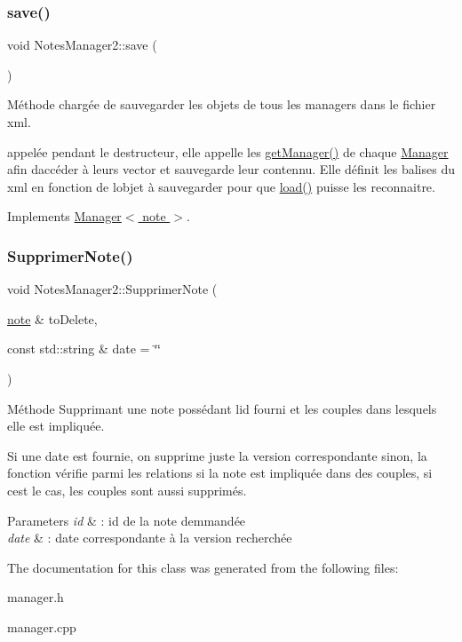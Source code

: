 \subsubsection{\texorpdfstring{save()}{save()}}
{\footnotesize\ttfamily void Notes\+Manager2\+::save (\begin{DoxyParamCaption}{ }\end{DoxyParamCaption})\hspace{0.3cm}{\ttfamily [virtual]}}



Méthode chargée de sauvegarder les objets de tous les managers dans le fichier xml. 

appelée pendant le destructeur, elle appelle les \hyperlink{class_notes_manager2_a392bc750d869bacbe50337531213f248}{get\+Manager()} de chaque \hyperlink{class_manager}{Manager} afin d\textquotesingle{}accéder à leurs vector et sauvegarde leur contennu. Elle définit les balises du xml en fonction de l\textquotesingle{}objet à sauvegarder pour que \hyperlink{class_notes_manager2_a2248b5b1620b2039fdba9b3c6476c6cc}{load()} puisse les reconnaitre. 

Implements \hyperlink{class_manager_a952734cfd645e6b257ef19ab06d4ded4}{Manager$<$ note $>$}.

\mbox{\label{class_notes_manager2_ac020f8488f0f71f92de1e8131a64d943}} 
\subsubsection{\texorpdfstring{Supprimer\+Note()}{SupprimerNote()}}
{\footnotesize\ttfamily void Notes\+Manager2\+::\+Supprimer\+Note (\begin{DoxyParamCaption}\item[{\hyperlink{classnote}{note} \&}]{to\+Delete,  }\item[{const std\+::string \&}]{date = {\ttfamily \char`\"{}\char`\"{}} }\end{DoxyParamCaption})}



Méthode Supprimant une note possédant l\textquotesingle{}id fourni et les couples dans lesquels elle est impliquée. 

Si une date est fournie, on supprime juste la version correspondante sinon, la fonction vérifie parmi les relations si la note est impliquée dans des couples, si c\textquotesingle{}est le cas, les couples sont aussi supprimés. 
\begin{DoxyParams}{Parameters}
{\em id} & \+: id de la note demmandée \\
\hline
{\em date} & \+: date correspondante à la version recherchée \\
\hline
\end{DoxyParams}


The documentation for this class was generated from the following files\+:\begin{DoxyCompactItemize}
\item 
manager.\+h\item 
manager.\+cpp\end{DoxyCompactItemize}
